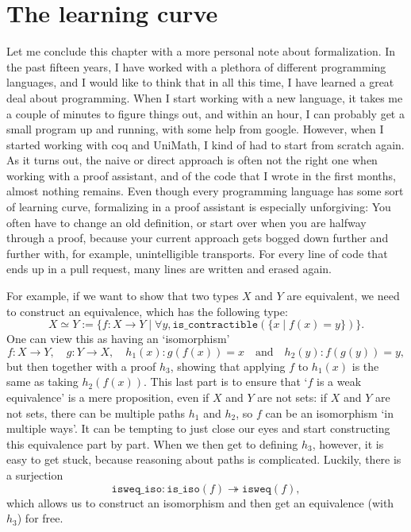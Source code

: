 \section{The learning curve}
Let me conclude this chapter with a more personal note about formalization. In the past fifteen years, I have worked with a plethora of different programming languages, and I would like to think that in all this time, I have learned a great deal about programming. When I start working with a new language, it takes me a couple of minutes to figure things out, and within an hour, I can probably get a small program up and running, with some help from google. However, when I started working with coq and UniMath, I kind of had to start from scratch again. As it turns out, the naive or direct approach is often not the right one when working with a proof assistant, and of the code that I wrote in the first months, almost nothing remains. Even though every programming language has some sort of learning curve, formalizing in a proof assistant is especially unforgiving: You often have to change an old definition, or start over when you are halfway through a proof, because your current approach gets bogged down further and further with, for example, unintelligible transports. For every line of code that ends up in a pull request, many lines are written and erased again.

For example, if we want to show that two types $ X $ and $ Y $ are equivalent, we need to construct an equivalence, which has the following type:
\[ X \simeq Y := \{ f : X \to Y \mid \forall y, \mathtt{is\_contractible}(\{ x \mid f(x) = y \}) \}. \]
One can view this as having an `isomorphism'
\[ f: X \to Y, \quad g : Y \to X, \quad h_1(x): g(f(x)) = x \quad \text{and} \quad h_2(y) : f(g(y)) = y, \]
but then together with a proof $ h_3 $, showing that applying $ f $ to $ h_1(x) $ is the same as taking $ h_2(f(x)) $. This last part is to ensure that `$ f $ is a weak equivalence' is a mere proposition, even if $ X $ and $ Y $ are not sets: if $ X $ and $ Y $ are not sets, there can be multiple paths $ h_1 $ and $ h_2 $, so $ f $ can be an isomorphism `in multiple ways'. It can be tempting to just close our eyes and start constructing this equivalence part by part. When we then get to defining $ h_3 $, however, it is easy to get stuck, because reasoning about paths is complicated. Luckily, there is a surjection
\[ \mathtt{isweq\_iso} : \mathtt{is\_iso}(f) \twoheadrightarrow \mathtt{isweq}(f), \]
which allows us to construct an isomorphism and then get an equivalence (with $ h_3 $) for free.

